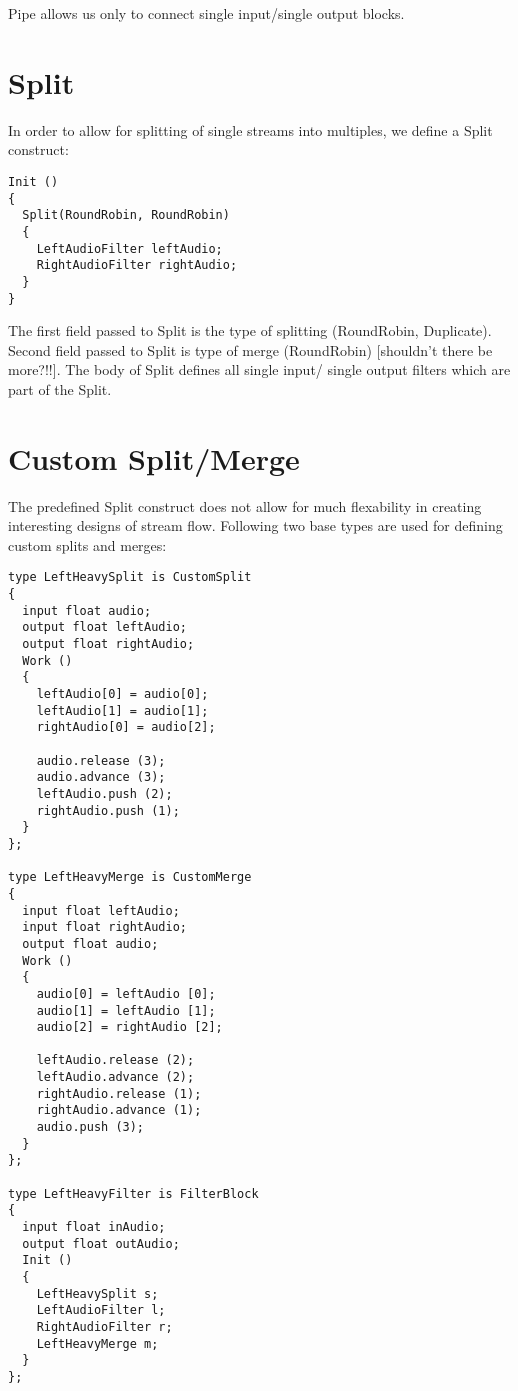 Pipe allows us only to connect single input/single output blocks.

\section{Split}

In order to allow for splitting of single streams into multiples,
we define a Split construct:

\begin{verbatim}
Init ()
{
  Split(RoundRobin, RoundRobin)
  {
    LeftAudioFilter leftAudio;
    RightAudioFilter rightAudio;
  }
}
\end{verbatim}

The first field passed to Split is the type of splitting (RoundRobin,
Duplicate).  Second field passed to Split is type of merge (RoundRobin)
[shouldn't there be more?!!].  The body of Split defines all single input/
single output filters which are part of the Split.

\section{Custom Split/Merge}

The predefined Split construct does not allow for much flexability in
creating interesting designs of stream flow.  Following two base types
are used for defining custom splits and merges:

\begin{verbatim}
type LeftHeavySplit is CustomSplit
{
  input float audio;
  output float leftAudio;
  output float rightAudio;
  Work ()
  {
    leftAudio[0] = audio[0];
    leftAudio[1] = audio[1];
    rightAudio[0] = audio[2];

    audio.release (3);
    audio.advance (3);
    leftAudio.push (2);
    rightAudio.push (1);
  }
};

type LeftHeavyMerge is CustomMerge
{
  input float leftAudio;
  input float rightAudio;
  output float audio;
  Work ()
  {
    audio[0] = leftAudio [0];
    audio[1] = leftAudio [1];
    audio[2] = rightAudio [2];

    leftAudio.release (2);
    leftAudio.advance (2);
    rightAudio.release (1);
    rightAudio.advance (1);
    audio.push (3);
  }
};

type LeftHeavyFilter is FilterBlock
{
  input float inAudio;
  output float outAudio;
  Init ()
  {
    LeftHeavySplit s;
    LeftAudioFilter l;
    RightAudioFilter r;
    LeftHeavyMerge m;
  }
};
\end{verbatim}

